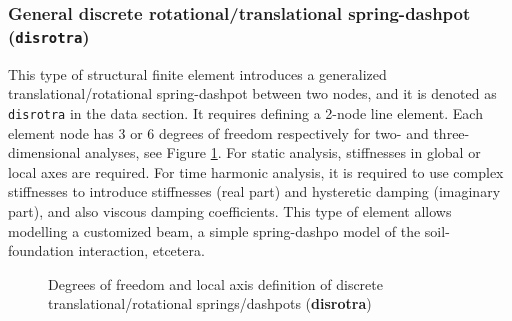 \documentclass[a4paper,fleqn]{book}
\begin{document}
\subsubsection{General discrete rotational/translational spring-dashpot (\texttt{disrotra})}

This type of structural finite element introduces a generalized translational/rotational spring-dashpot between two nodes, and it is denoted as \texttt{disrotra} in the data section. It requires defining a 2-node line element. Each element node has 3 or 6 degrees of freedom respectively for two- and three-dimensional analyses, see Figure \ref{fig:disrotra}. For static analysis, stiffnesses in global or local axes are required. For time harmonic analysis, it is required to use complex stiffnesses to introduce stiffnesses (real part) and hysteretic damping (imaginary part), and also viscous damping coefficients. This type of element allows modelling a customized beam, a simple spring-dashpo model of the soil-foundation interaction, etcetera.

\begin{figure}[h]

\caption{Degrees of freedom and local axis definition of discrete translational/rotational springs/dashpots (\textbf{disrotra})}
\label{fig:disrotra}
\end{figure}
\end{document}
